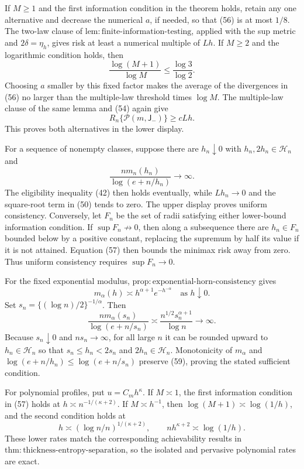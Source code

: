 If \(M\ge1\) and the first information condition in the theorem holds, retain any one alternative and decrease the numerical \(a\), if needed, so that (56) is at most \(1/8\).  The two-law clause of \(\mathrm{lem:finite\text{-}information\text{-}testing}\), applied with the sup metric and \(2\delta=\eta_h\), gives risk at least a numerical multiple of \(Lh\).  If \(M\ge2\) and the logarithmic condition holds, then
\[
 \frac{\log(M+1)}{\log M}\le\frac{\log3}{\log2}.
\]
Choosing \(a\) smaller by this fixed factor makes the average of the divergences in (56) no larger than the multiple-law threshold times \(\log M\).  The multiple-law clause of the same lemma and (54) again give
\[
 R_n\{\mathcal P(m,\mathsf J_{-})\}\ge cLh. \tag{57}
\]
This proves both alternatives in the lower display.

For a sequence of nonempty classes, suppose there are \(h_n\downarrow0\) with \(h_n,2h_n\in\mathcal H_n\) and
\[
 \frac{nm_n(h_n)}{\log(e+n/h_n)}\longrightarrow\infty. \tag{58}
\]
The eligibility inequality (42) then holds eventually, while \(Lh_n\to0\) and the square-root term in (50) tends to zero.  The upper display proves uniform consistency.  Conversely, let \(F_n\) be the set of radii satisfying either lower-bound information condition.  If \(\sup F_n\not\to0\), then along a subsequence there are \(h_n\in F_n\) bounded below by a positive constant, replacing the supremum by half its value if it is not attained.  Equation (57) then bounds the minimax risk away from zero.  Thus uniform consistency requires \(\sup F_n\to0\).

For the fixed exponential modulus, \(\mathrm{prop:exponential\text{-}horn\text{-}consistency}\) gives
\[
 m_\alpha(h)\asymp h^{\alpha+1}e^{-h^{-\alpha}}
 \quad\text{as }h\downarrow0.
\]
Set \(s_n=\{(\log n)/2\}^{-1/\alpha}\).  Then
\[
 \frac{nm_\alpha(s_n)}{\log(e+n/s_n)}
 \asymp\frac{n^{1/2}s_n^{\alpha+1}}{\log n}
 \longrightarrow\infty. \tag{59}
\]
Because \(s_n\downarrow0\) and \(ns_n\to\infty\), for all large \(n\) it can be rounded upward to \(h_n\in\mathcal H_n\) so that \(s_n\le h_n<2s_n\) and \(2h_n\in\mathcal H_n\).  Monotonicity of \(m_\alpha\) and \(\log(e+n/h_n)\le\log(e+n/s_n)\) preserve (59), proving the stated sufficient condition.

For polynomial profiles, put \(u=C_mh^\kappa\).  If \(M\asymp1\), the first information condition in (57) holds at \(h\asymp n^{-1/(\kappa+2)}\).  If \(M\asymp h^{-1}\), then \(\log(M+1)\asymp\log(1/h)\), and the second condition holds at
\[
 h\asymp(\log n/n)^{1/(\kappa+2)},
 \qquad nh^{\kappa+2}\asymp\log(1/h).
\]
These lower rates match the corresponding achievability results in \(\mathrm{thm:thickness\text{-}entropy\text{-}separation}\), so the isolated and pervasive polynomial rates are exact.

